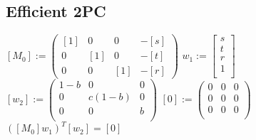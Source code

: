 \documentclass{article}      	%
\begin{document}
\subsection{Efficient 2PC}
\vspace{1em}

$[M_0] := \begin{pmatrix}
[1] & 0 & 0 & -[s] \\
0 & [1] & 0 & -[t] \\
0 & 0 & [1] & -[r]
\end{pmatrix} $
$w_1 := \begin{bmatrix} s \\ t \\ r \\ 1 \\ \end{bmatrix}$
$[w_2] := \begin{pmatrix}
1-b & 0 & 0 \\
0 & c(1-b) & 0 \\
0 & 0 & b \\
\end{pmatrix}$
$[0] :=
\begin{pmatrix}
0 & 0 & 0 \\
0 & 0 & 0 \\
0 & 0 & 0 \\
\end{pmatrix} $
$([M_0]w_1)^T[w_2] = [0]$
\end{document}
